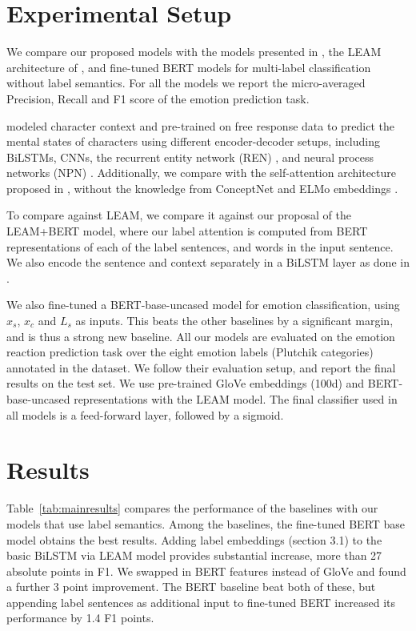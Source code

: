\documentclass[11pt,a4paper]{article}
\begin{document}
\section{Experimental Setup}
\label{sec:baseline}

\noindent We compare our proposed models with the models presented in \citet{rashkin2018modeling}, the LEAM architecture of \citet{wang2018joint}, and fine-tuned BERT models \cite{devlin-etal-2019-bert} for multi-label classification without label semantics. For all the models we report the micro-averaged Precision, Recall and F1 score of the emotion prediction task.

\citet{rashkin2018modeling} modeled character context and pre-trained on free response data to predict the mental states of characters using different encoder-decoder setups, including BiLSTMs, CNNs, the recurrent entity network (REN) \cite{henaff2016tracking}, and neural process networks (NPN) \cite{bosselut2017simulating}.
Additionally, we compare with the self-attention architecture proposed in \cite{paulfrank:2019}, without the knowledge from ConceptNet \cite{speer-havasi-2012-representing} and ELMo embeddings \cite{Peters2018DeepCW}.

To compare against LEAM, we compare it against our proposal of the LEAM+BERT model, where our label attention is computed from BERT representations of each of the label sentences, and words in the input sentence. We also encode the sentence and context separately in a BiLSTM layer as done in \citet{rashkin2018modeling}.

We also fine-tuned a BERT-base-uncased model for emotion classification, using $x_{s}$, $x_{c}$ and $L_{s}$ as inputs. This beats the other baselines by a significant margin, and is thus a strong new baseline. All our models are evaluated on the emotion reaction prediction task over the eight emotion labels (Plutchik categories) annotated in the \citet{rashkin2018modeling} dataset. We follow their evaluation setup, and report the final results on the test set. We use pre-trained GloVe embeddings (100d) and BERT-base-uncased representations with the LEAM model. The final classifier used in all models is a feed-forward layer, followed by a sigmoid. \section{Results}
Table~\ref{tab:mainresults} compares the performance of the baselines with our models that use label semantics. Among the baselines, the fine-tuned BERT base model obtains the best results. Adding label embeddings (section 3.1) to the basic BiLSTM via LEAM model provides substantial increase, more than 27 absolute points in F1. We swapped in BERT features instead of GloVe and found a further 3 point improvement. 
The BERT baseline beat both of these, but appending label sentences as additional input to fine-tuned BERT increased its performance by 1.4 F1 points.
\end{document}
